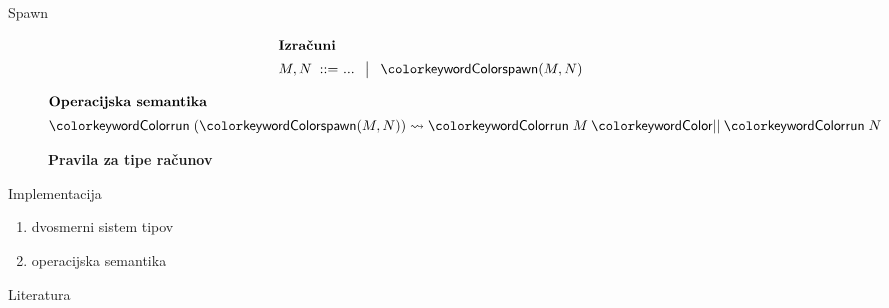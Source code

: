 \documentclass{beamer}
\theoremstyle{definition} %
\theoremstyle{plain} %
\begin{document}
	\begin{frame}{Spawn}
		
		\begin{figure}[hp]
			\parbox{\textwidth}{
				\centering
				\tiny
				\begin{align*}
				\shortintertext{\textbf{Izračuni}}
				M, N
				\bnfis & ... \,\bnfor\! \tmspawn{M}{N}
				\end{align*}
			} 
		\end{figure}
		
		\begin{figure}[tp]
			\centering
			\tiny
			\begin{align*}
			\shortintertext{\textbf{Operacijska semantika}}
			\tmrun{(\tmspawn{M}{N})} & \reduces \tmpar{\tmrun{M}}{\tmrun{N}}
			\end{align*}
		\end{figure}
	
	
		\begin{figure}[tp]
			\centering
			\tiny
			\textbf{Pravila za tipe računov}
			\begin{mathpar}
			\end{mathpar}
		\end{figure}
		
	\end{frame}
	
	
	
	
	\begin{frame}{Implementacija}
		\begin{enumerate}
			\item dvosmerni sistem tipov
			\item operacijska semantika
		\end{enumerate}
	\end{frame}
	
	
	
	
	\begin{frame}{Literatura}
				
		
		
	\end{frame}
	
	
\end{document}
